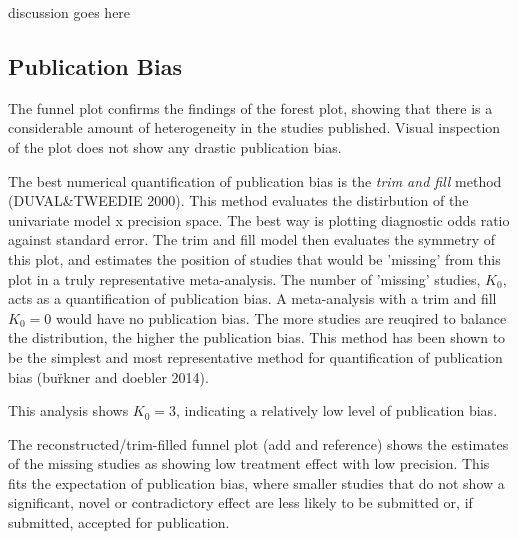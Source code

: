 discussion goes here


\subsection{Publication Bias}

The funnel plot confirms the findings of the forest plot, showing that there is a considerable amount of heterogeneity in the studies published.
Visual inspection of the plot does not show any drastic publication bias.

The best numerical quantification of publication bias is the \emph{trim and fill} method (DUVAL\&TWEEDIE 2000).
This method evaluates the distirbution of the univariate model x precision space. 
The best way is plotting diagnostic odds ratio against standard error.
The trim and fill model then evaluates the symmetry of this plot, and estimates the position of studies that would be 'missing' from this plot in a truly representative meta-analysis.
The number of 'missing' studies, $K_0$, acts as a quantification of publication bias. 
A meta-analysis with a trim and fill $K_0 = 0$ would have no publication bias.
The more studies are reuqired to balance the distribution, the higher the publication bias.
This method has been shown to be the simplest and most representative method for quantification of publication bias (bu\"rkner and doebler 2014).


This analysis shows $K_0 = 3$, indicating a relatively low level of publication bias.

The reconstructed/trim-filled funnel plot (add and reference) shows the estimates of the missing studies as showing low treatment effect with low precision.
This fits the expectation of publication bias, where smaller studies that do not show a significant, novel or contradictory effect are less likely to be submitted or, if submitted, accepted for publication.
